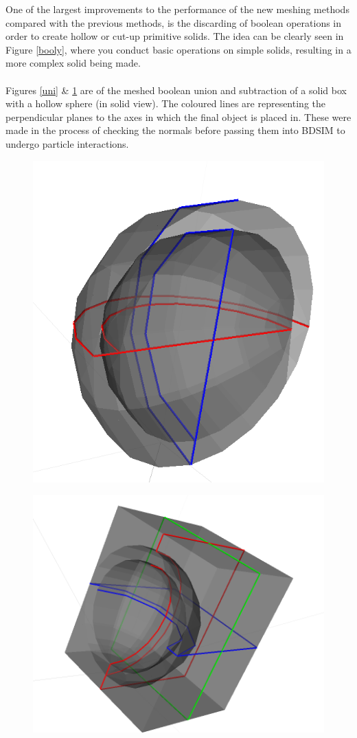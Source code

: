 \documentclass[12pt,a4paper]{article}
\begin{document}
One of the largest improvements to the performance of the new meshing methods compared with the previous methods, is the discarding of boolean operations in order to create hollow or cut-up primitive solids. The idea can be clearly seen in Figure \ref{booly}, where you conduct basic operations on simple solids, resulting in a more complex solid being made.
\\\\
\noindent Figures \ref{uni} \& \ref{sub} are of the meshed boolean union and subtraction of a solid box with a hollow sphere (in solid view). The coloured lines are representing the perpendicular planes to the axes in which the final object is placed in. These were made in the process of checking the normals before passing them into BDSIM to undergo particle interactions.
\\
\begin{figure}[h!]
\centering
\begin{minipage}{.4\textwidth}
  \centering
  \includegraphics[height=0.5\linewidth]{Images//Booleans/SphereUnion.png}
  \label{uni}
\end{minipage}%
\begin{minipage}{.4\textwidth}
  \centering
  \includegraphics[height=0.5\linewidth]{Images//Booleans//SphereSubtraction.png}
  \label{sub}
\end{minipage}%
\end{figure}
\end{document}
